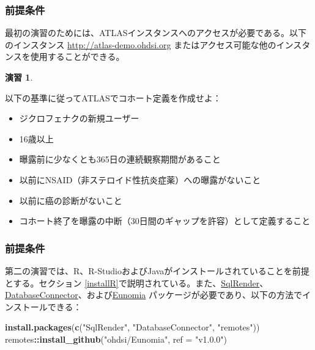 \documentclass[
  11pt]{book}
\newenvironment{Shaded}{\begin{snugshade}}{\end{snugshade}}
\newcommand{\AttributeTok}[1]{\textcolor[rgb]{0.13,0.29,0.53}{#1}}
\newcommand{\FunctionTok}[1]{\textcolor[rgb]{0.13,0.29,0.53}{\textbf{#1}}}
\newcommand{\NormalTok}[1]{#1}
\newcommand{\SpecialCharTok}[1]{\textcolor[rgb]{0.81,0.36,0.00}{\textbf{#1}}}
\newcommand{\StringTok}[1]{\textcolor[rgb]{0.31,0.60,0.02}{#1}}
\providecommand{\tightlist}{%
  \setlength{\itemsep}{0pt}\setlength{\parskip}{0pt}}
\theoremstyle{definition}
\theoremstyle{definition}
\theoremstyle{definition}
\newtheorem{exercise}{演習}[chapter]
\theoremstyle{definition}
\theoremstyle{remark}
\begin{document}
\subsubsection*{前提条件}\label{ux524dux63d0ux6761ux4ef6-4}

最初の演習のためには、ATLASインスタンスへのアクセスが必要である。以下のインスタンス \url{http://atlas-demo.ohdsi.org} またはアクセス可能な他のインスタンスを使用することができる。

\begin{exercise}
\protect\hypertarget{exr:exerciseCohortsAtlas}{}\label{exr:exerciseCohortsAtlas}

以下の基準に従ってATLASでコホート定義を作成せよ：

\begin{itemize}
\tightlist
\item
  ジクロフェナクの新規ユーザー
\item
  16歳以上
\item
  曝露前に少なくとも365日の連続観察期間があること
\item
  以前にNSAID（非ステロイド性抗炎症薬）への曝露がないこと
\item
  以前に癌の診断がないこと
\item
  コホート終了を曝露の中断（30日間のギャップを許容）として定義すること
\end{itemize}

\end{exercise}

\subsubsection*{前提条件}\label{ux524dux63d0ux6761ux4ef6-5}

第二の演習では、R、R-StudioおよびJavaがインストールされていることを前提とする。セクション \ref{installR}で説明されている。また、\href{https://ohdsi.github.io/SqlRender/}{SqlRender}、\href{https://ohdsi.github.io/DatabaseConnector/}{DatabaseConnector}、および\href{https://ohdsi.github.io/Eunomia/}{Eunomia} パッケージが必要であり、以下の方法でインストールできる：

\begin{Shaded}
\begin{Highlighting}[]
\FunctionTok{install.packages}\NormalTok{(}\FunctionTok{c}\NormalTok{(}\StringTok{"SqlRender"}\NormalTok{, }\StringTok{"DatabaseConnector"}\NormalTok{, }\StringTok{"remotes"}\NormalTok{))}
\NormalTok{remotes}\SpecialCharTok{::}\FunctionTok{install\_github}\NormalTok{(}\StringTok{"ohdsi/Eunomia"}\NormalTok{, }\AttributeTok{ref =} \StringTok{"v1.0.0"}\NormalTok{)}
\end{Highlighting}
\end{Shaded}
\end{document}
